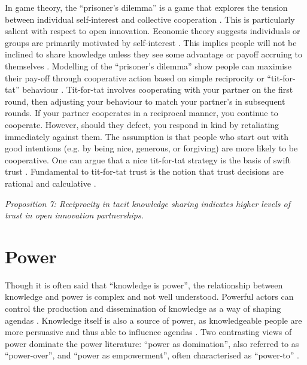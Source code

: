 In game theory, the \enquote{prisoner’s dilemma} is a game that explores the tension between individual self-interest and collective cooperation \citep{richards2001reciprocity}. This is particularly salient with respect to open innovation. Economic theory suggests individuals or groups are primarily motivated by self-interest \citep{axelrod1984evolution}. This implies people will not be inclined to share knowledge unless they see some advantage or payoff accruing to themselves \citep{yang2006knowledge}. Modelling of the \enquote{prisoner's dilemma} show people can maximise their pay-off through cooperative action based on simple reciprocity or \enquote{tit-for-tat} behaviour \citep{axelrod1981evolution,richards2001reciprocity}. Tit-for-tat involves cooperating with your partner on the first round, then adjusting your behaviour to match your partner’s in subsequent rounds. If your partner cooperates in a reciprocal manner, you continue to cooperate. However, should they defect, you respond in kind by retaliating immediately against them. The assumption is that people who start out with good intentions (e.g. by being nice, generous, or forgiving) are more likely to be cooperative. One can argue that a nice tit-for-tat strategy is the basis of swift trust \citep{fulmer2013trust,mollering2013process}. Fundamental to tit-for-tat trust is the notion that trust decisions are rational and calculative \citep{fulmer2013trust}.

\begin{tcolorbox}
\emph{Proposition 7: Reciprocity in tacit knowledge sharing indicates higher levels of trust in open innovation partnerships.}
\end{tcolorbox}

\section{Power}

 Though it is often said that \enquote{knowledge is power}, the relationship between knowledge and power is complex and not well understood. Powerful actors can control the production and dissemination of knowledge as a way of shaping agendas \citep{gaventa2007power}. Knowledge itself is also a source of power, as knowledgeable people are more persuasive and thus able to influence agendas \citep{hart1997power}. Two contrasting views of power dominate the power literature: \enquote{power as domination}, also referred to as \enquote{power-over}, and \enquote{power as empowerment}, often characterised as \enquote{power-to} \citep{haugaard2012rethinking}. \medskip
 
